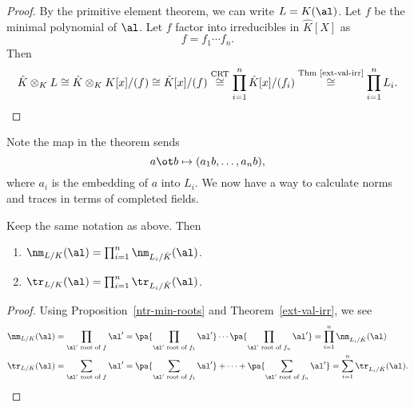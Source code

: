 \begin{proof}
By the primitive element theorem, %
we can write $L=K(\al)$. Let $f$ be the minimal polynomial of $\al$. Let $f$ factor into irreducibles in $\hat K[X]$ as
\[
f=f_1\cdots f_n.
\]
Then
\[
\hat K\otimes_K L\cong \hat K\otimes_K K[x]/(f)\cong \hat K[x]/(f)\stackrel{\text{CRT}}{\cong} \prod_{i=1}^n \hat K[x]/(f_i)
\stackrel{\text{Thm~\ref{ext-val-irr}}}{\cong} \prod_{i=1}^n L_i.\qedhere
\]
\end{proof}
Note the map in the theorem sends 
\[
a\ot b\mapsto (a_1b,\ldots, a_nb),
\]
where $a_i$ is the embedding of $a$ into $L_i$.
We now have a way to calculate norms and traces in terms of completed fields.
\begin{cor}
Keep the same notation as above. Then
\begin{enumerate}
\item $\nm_{L/K}(\al)=\prod_{i=1}^n \nm_{L_i/\hat K}(\al)$.
\item $\tr_{L/K}(\al)=\prod_{i=1}^n \tr_{L_i/\hat K}(\al)$.
\end{enumerate}
\end{cor}
\begin{proof}
Using Proposition~\ref{ntr-min-roots} and Theorem~\ref{ext-val-irr}, we see
\begin{align*}
\nm_{L/K}(\al)&=\prod_{\al'\text{ root of }f}\al'=\pa{\prod_{\al'\text{ root of }f_1}\al'}\cdots \pa{\prod_{\al'\text{ root of }f_n}\al'}
=\prod_{i=1}^n \nm_{L_i/\hat K}(\al)\\
\tr_{L/K}(\al)&=\sum_{\al'\text{ root of }f}\al'=\pa{\sum_{\al'\text{ root of }f_1}\al'}+\cdots+ \pa{\sum_{\al'\text{ root of }f_n}\al'}
=\sum_{i=1}^n \tr_{L_i/\hat K}(\al).
\end{align*}
\end{proof}

